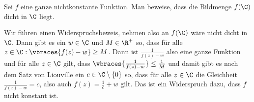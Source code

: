 \begin{exercise}
    Sei $f$ eine ganze nichtkonstante Funktion. Man beweise, dass die Bildmenge $f(\C)$ dicht in $\C$ liegt.
\end{exercise}
\begin{solution}
    Wir führen einen Widerspruchsbeweis, nehmen also an $f(\C)$ wäre nicht dicht in $\C$. Dann gibt es ein $w \in \C$ und $M \in \R^+$ so, dass für alle $z \in \C: \vbraces{f(z) - w} \geq M$. Dann ist $\frac{1}{f(z)- w}$ also eine ganze Funktion und für alle $z \in \C$ gilt, dass $\vbraces{\frac{1}{f(z) - w}}\leq \frac{1}{M}$ und damit gibt es nach dem Satz von Liouville ein $c \in \C \setminus \{0\}$ so, dass für alle $z \in \C$ die Gleichheit $\frac{1}{f(z) - w} = c$, also auch $f(z) = \frac{1}{c} + w$ gilt. Das ist ein Widerspruch dazu, dass $f$ nicht konstant ist.
\end{solution}